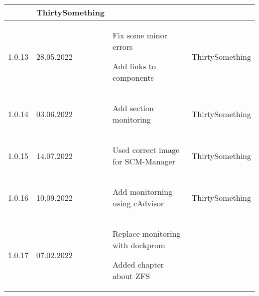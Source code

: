 \begin{tiny}
\begin{longtable}{ | p{} | p{} | P{0.49\textwidth} | p{0.15\textwidth} | }
\begin{tsLTItemize}
        \end{tsLTItemize}
                                 &
        ThirtySomething            \\
        \hline
        1.0.13                   &
        28.05.2022               &
        \begin{tsLTItemize}
            \item Fix some minor errors
            \item Add links to components
        \end{tsLTItemize}
                                 &
        ThirtySomething            \\
        \hline
        1.0.14                   &
        03.06.2022               &
        \begin{tsLTItemize}
            \item Add section monitoring
        \end{tsLTItemize}
                                 &
        ThirtySomething            \\
        \hline
        1.0.15                   &
        14.07.2022               &
        \begin{tsLTItemize}
            \item Used correct image for SCM-Manager
        \end{tsLTItemize}
                                 &
        ThirtySomething            \\
        \hline
        1.0.16                   &
        10.09.2022               &
        \begin{tsLTItemize}
            \item Add monitorning using cAdvisor
        \end{tsLTItemize}
                                 &
        ThirtySomething            \\
        \hline
        1.0.17                   &
        07.02.2022               &
        \begin{tsLTItemize}
            \item Replace monitoring with dockprom
            \item Added chapter about ZFS

\end{tsLTItemize}
\end{longtable}
\end{tiny}
